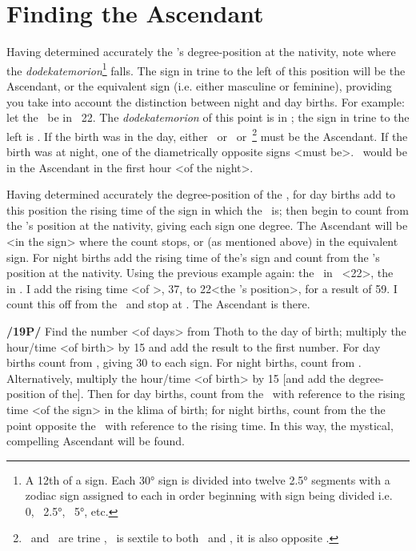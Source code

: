 \section{Finding the Ascendant}
Having determined accurately the \Sun’s degree-position at the nativity, note where the \textsl{dodekatemorion}\footnote{A 12th of a sign. Each 30° sign is divided into twelve 2.5° segments with a zodiac sign assigned to each in order beginning with sign being divided i.e. \Aries\, 0, \Taurus\, 2.5°, \Gemini\, 5°, etc.} falls. The sign in trine to the left of this position will be the Ascendant, or the equivalent sign (i.e. either masculine or feminine), providing you take into account the distinction between night and day births. For example: let the \Sun\, be in \Aquarius\, 22\deg. The \textsl{dodekatemorion} of this point is in \Scorpio; the sign in trine to the left is \Pisces. If the birth was in the day, either \Pisces\, or \Taurus\, or \Cancer\,\footnote{\Pisces\, and \Cancer\, are trine \Scorpio, \Taurus\, is sextile to both \Pisces\, and \Cancer, it is also opposite \Scorpio.} must be the Ascendant. If the birth was at night, one of the diametrically opposite signs <must be>. \Virgo\, would be in the Ascendant in the first hour <of the night>.

Having determined accurately the degree-position of the \Sun, for day births add to this position the rising time of the sign in which the \Sun\, is; then begin to count from the \Moon’s position at the nativity, giving each sign one degree. The Ascendant will be <in the sign> where the count stops, or (as mentioned above) in the equivalent sign. For night births add the rising time of the\Moon’s sign and count from the \Sun’s position at the nativity. Using the previous example again: the \Sun\, in \Aquarius\, <22\deg>, the \Moon\, in
\Scorpio. I add the rising time <of \Scorpio>, 37, to 22\deg <the \Sun’s position>, for a result of 59. I count this off from the \Sun\, and stop at \Virgo. The Ascendant is there.

\textbf{/19P/} Find the number <of days> from Thoth to the day of birth; multiply the hour/time <of birth> by 15 and add the result to the first number. For day births count from \Virgo, giving 30 to each sign. For night births, count from \Pisces.
Alternatively, multiply the hour/time <of birth> by 15 [and add the degree-position of the\Sun]. Then for day births, count from the \Sun\, with reference to the rising time <of the sign> in the klima of birth; for night births, count from the the point opposite the \Sun\, with reference to the rising time. In this way, the mystical, compelling Ascendant will be found. 

